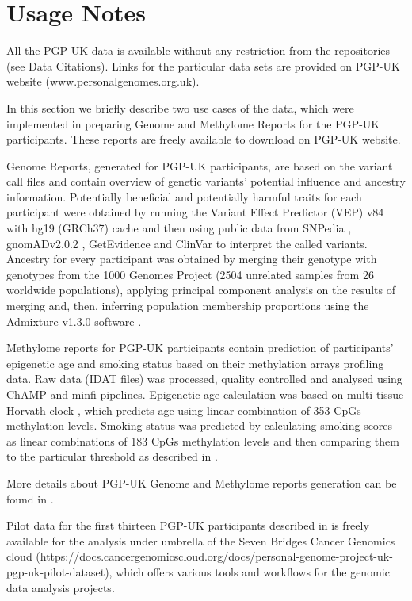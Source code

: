 \documentclass[english]{article}
\begin{document}
\section*{Usage Notes}

All the PGP-UK data is available without any restriction from the repositories (see Data Citations). Links for the particular data sets are provided on PGP-UK website (www.personalgenomes.org.uk).

In this section we briefly describe two use cases of the data, which were implemented in preparing Genome and Methylome Reports for the PGP-UK participants. These reports are freely available to download on PGP-UK website.

Genome Reports, generated for PGP-UK participants, are based on the variant call files and contain overview of genetic variants' potential influence and ancestry information. Potentially beneficial and potentially harmful traits for each participant were obtained by running the Variant Effect Predictor (VEP) v84 \cite{ensembl} with hg19 (GRCh37) cache and then using public data from SNPedia \cite{snpedia}, gnomADv2.0.2 \cite{gnomad}, GetEvidence \cite{get_evidence} and ClinVar \cite{clinvar} to interpret the called variants. Ancestry for every participant was obtained by merging their genotype with genotypes from the 1000 Genomes Project \cite{1000genomes} (2504 unrelated samples from 26 worldwide populations), applying principal component analysis on the results of merging and, then, inferring population membership proportions using the Admixture v1.3.0 software \cite{ancestry}.

Methylome reports for PGP-UK participants contain prediction of participants' epigenetic age and smoking status based on their methylation arrays profiling data. Raw data (IDAT files) was processed, quality controlled and analysed using ChAMP \cite{champ2013, champ2017} and minfi \cite{minfi} pipelines. Epigenetic age calculation was based on multi-tissue Horvath clock \cite{horvath}, which predicts age using linear combination of 353 CpGs methylation levels. Smoking status was predicted by calculating smoking scores as linear combinations of 183 CpGs methylation levels and then comparing them to the particular threshold as described in \cite{smoking_score}.

More details about PGP-UK Genome and Methylome reports generation can be found in \cite{pgp10}.

Pilot data for the first thirteen PGP-UK participants described in \cite{pgp10} is freely available for the analysis under umbrella of the Seven Bridges Cancer Genomics cloud (https://docs.cancergenomicscloud.org/docs/personal-genome-project-uk-pgp-uk-pilot-dataset), which offers various tools and workflows for the genomic data analysis projects.
\end{document}
